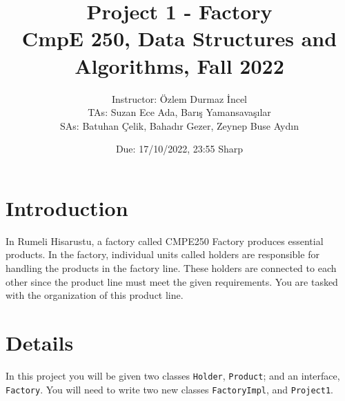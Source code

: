 \documentclass[12pt]{article}
\title{\vspace{-1cm} \Huge Project 1 - Factory\\ \LARGE CmpE 250, Data Structures and Algorithms, Fall 2022 }
\author{
  Instructor: Özlem Durmaz \.{I}ncel\\
  TAs: Suzan Ece Ada, Bar{\i}\c{s} Yamansava\c{s}{\i}lar\\
  SAs:  Batuhan \c{C}elik, Bahad{\i}r Gezer, Zeynep Buse Ayd{\i}n
}
\date{Due: 17/10/2022, 23:55 Sharp}
\begin{document}
  \maketitle
  \vspace{0.05cm}
  
  \section{Introduction}

In Rumeli Hisarustu, a factory called CMPE250 Factory produces essential products. In the factory, individual units called holders are responsible for handling the products in the factory line. These holders are connected to each other since the product line must meet the given requirements. You are tasked with the organization of this product line.

\section{Details}

 In this project you will be given two classes \texttt{Holder}, \texttt{Product}; and an interface, \texttt{Factory}. You will need to write two new classes \texttt{FactoryImpl}, and \texttt{Project1}. 
\end{document}
